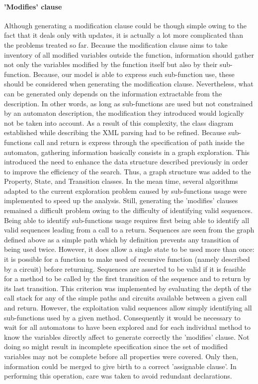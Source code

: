 \paragraph{'Modifies' clause}
Although generating a modification clause could be though simple owing to the fact that it deals only with updates, it is actually a lot more complicated than the problems treated so far. Because the modification clause aims to take inventory of all modified variables outside the function, information should gather not only the variables modified by the function itself but also by their sub-function. Because, our model is able to express such sub-function use, these should be considered when generating the modification clause. Nevertheless, what can be generated only depends on the information extractable from the description. In other words, as long as sub-functions are used but not constrained by an automaton description, the modification they introduced would logically not be taken into account. 
As a result of this complexity, the class diagram established while describing the XML parsing had to be refined. Because sub-functions call and return is express through the specification of path inside the automaton, gathering information basically consists in a graph exploration. This introduced the need to enhance the data structure described previously in order to improve the efficiency of the search. Thus, a graph structure was added to the Property, State, and Transition classes. In the mean time, several algorithms adapted to the current exploration problem caused by sub-functions usage were implemented to speed up the analysis. 
Still, generating the 'modifies' clauses remained a difficult problem owing to the difficulty of identifying valid sequences. Being able to identify sub-functions usage requires first being able to identify all valid sequences leading from a call to a return. Sequences are seen from the graph defined above as a simple path which by definition prevents any transition of being used twice. However, it does allow a single state to be used more than once: it is possible for a function to make used of recursive function (namely described by a circuit) before returning. Sequences are asserted to be valid if it is feasible for a method to be called by the first transition of the sequence and to return by its last transition. This criterion was implemented by evaluating the depth of the call stack for any of the simple paths and circuits available between a given call and return. 
However, the exploitation valid sequences allow simply identifying all sub-functions used by a given method. Consequently it would be necessary to wait for all automatons to have been explored and for each individual method to know the variables directly affect to generate correctly the 'modifies' clause. Not doing so might result in incomplete specification since the set of modified variables may not be complete before all properties were covered. Only then, information could be merged to give birth to a correct 'assignable clause'. In performing this operation, care was taken to avoid redundant declarations. 


